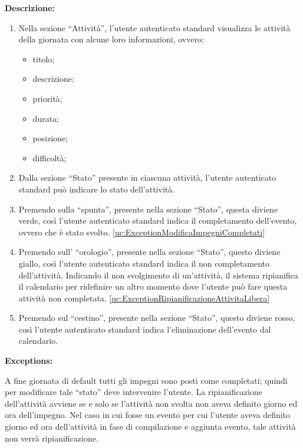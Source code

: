 \begin{listaPersonale}[UC]{}
    \textbf{Descrizione:}
    \begin{enumerate}
        \item Nella sezione “Attività”, l'utente autenticato standard visualizza le attività della giornata con alcune loro informazioni, ovvero:
              \begin{itemize}
                  \item titolo;
                  \item descrizione;
                  \item priorità;
                  \item durata;
                  \item posizione;
                  \item difficoltà;
              \end{itemize}
        \item Dalla sezione “Stato” presente in ciascuna attività, l'utente autenticato standard può indicare lo stato dell'attività.
        \item Premendo sulla “spunta”, presente nella sezione “Stato”, questa diviene verde, così l'utente autenticato standard indica il completamento dell'evento, ovvero che è stato svolto. \ref{uc:ExceptionModificaImpegniCompletati}
        \item Premendo sull' “orologio”, presente nella sezione “Stato”, questo diviene giallo, così l'utente autenticato standard indica il non completamento dell'attività. Indicando il non svolgimento di un'attività, il sistema ripianifica il calendario per ridefinire un altro momento dove l'utente può fare questa attività non completata. \ref{uc:ExceptionRipianificazioneAttivitaLibera}
        \item Premendo sul “cestino”, presente nella sezione “Stato”, questo diviene rosso, così l'utente autenticato standard indica l'eliminazione dell'evento dal calendario.
    \end{enumerate}



    \textbf{Exceptions:}
    \begin{enumerate}[label=\textbf{[exception \arabic{enumii}]}, ref= \textbf{[exception \arabic{enumii}]}]
         A fine giornata di default tutti gli impegni sono posti come completati; quindi per modificare tale “stato” deve intervenire l'utente.
         La ripianificazione dell'attività avviene se e solo se l'attività non svolta non aveva definito giorno ed ora dell'impegno. Nel caso in cui fosse un evento per cui l'utente aveva definito giorno ed ora dell'attività in fase di compilazione e aggiunta evento, tale attività non verrà ripianificazione.
    \end{enumerate}


\end{listaPersonale}
